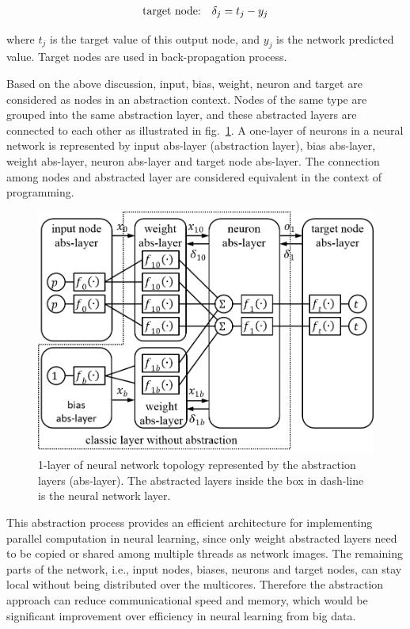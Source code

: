 \documentclass[procedia]{easychair}
\begin{document}
\begin{align}
    & \text{target node:} & \delta_j = t_j - y_j \notag
\end{align}

where $t_j$ is the target value of this output node, and $y_j$ is the network predicted value.  Target nodes are used in back-propagation process.

Based on the above discussion, input, bias, weight, neuron and target are considered as nodes in an abstraction context.  Nodes of the same type are grouped into the same abstraction layer, and these abstracted layers are connected to each other as illustrated in fig.~\ref{fig:nn_abstracted}.  A one-layer of neurons in a neural network is represented by input abs-layer (abstraction layer), bias abs-layer, weight abs-layer, neuron abs-layer and target node abs-layer.  The connection among nodes and abstracted layer are considered equivalent in the context of programming.

\begin{figure}[tb]
    \begin{centering}
        \includegraphics[scale=0.5]{../../pic/nn_abstracted.png}
        \caption{1-layer of neural network topology represented by the abstraction layers (abs-layer).  The abstracted layers inside the box in dash-line is the neural network layer.}
        \label{fig:nn_abstracted}
	\end{centering}
\end{figure}

This abstraction process provides an efficient architecture for implementing parallel computation in neural learning, since only weight abstracted layers need to be copied or shared among multiple threads as network images.  The remaining parts of the network, i.e., input nodes, biases, neurons and target nodes, can stay local without being distributed over the multicores.  Therefore the abstraction approach can reduce communicational speed and memory, which would be significant improvement over efficiency in neural learning from big data.
\end{document}
